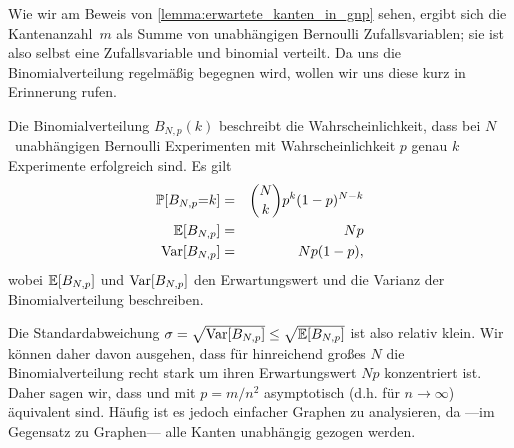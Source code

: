\bigskip

Wie wir am Beweis von \cref{lemma:erwartete_kanten_in_gnp} sehen, ergibt sich die Kantenanzahl~$m$ als Summe von unabhängigen Bernoulli Zufallsvariablen;
sie ist also selbst eine Zufallsvariable und binomial verteilt.
Da uns die Binomialverteilung regelmäßig begegnen wird, wollen wir uns diese kurz in Erinnerung rufen.
\begin{definition}
    Die  Binomialverteilung $B_{N, p}(k)$ beschreibt die Wahrscheinlichkeit, dass bei $N$~unabhängigen Bernoulli Experimenten mit Wahrscheinlichkeit $p$ genau $k$ Experimente erfolgreich sind.
    Es gilt 
    \begin{eqnarray*}
        \mathbb{P}\!\left[B_{N,p} {=} k\right] &=& \binom{N}{k} p^k (1-p)^{N-k} \\
        \mathbb{E}\!\left[B_{N,p}\right] &=& Np \\
        \operatorname{Var}\!\left[B_{N,p}\right] &=& Np(1-p),
    \end{eqnarray*}
    wobei $\mathbb{E}\!\left[B_{N,p}\right]$ und $\operatorname{Var}\!\left[B_{N,p}\right]$ den Erwartungswert und die Varianz der Binomialverteilung beschreiben.
\end{definition}

Die Standardabweichung $\sigma = \sqrt{\operatorname{Var}\!\left[B_{N,p}\right]} \le \sqrt{\mathbb{E}\!\left[B_{N,p}\right]}$ ist also relativ klein.
Wir können daher davon ausgehen, dass für hinreichend großes $N$ die Binomialverteilung recht stark um ihren Erwartungswert $Np$ konzentriert ist.
Daher sagen wir, dass \Gnm und \Gnp mit $p=m/n^2$ asymptotisch (d.h. für $n \to \infty$) äquivalent sind.
Häufig ist es jedoch einfacher \Gnp Graphen zu analysieren, da ---im Gegensatz zu \Gnm Graphen--- alle Kanten unabhängig gezogen werden.

